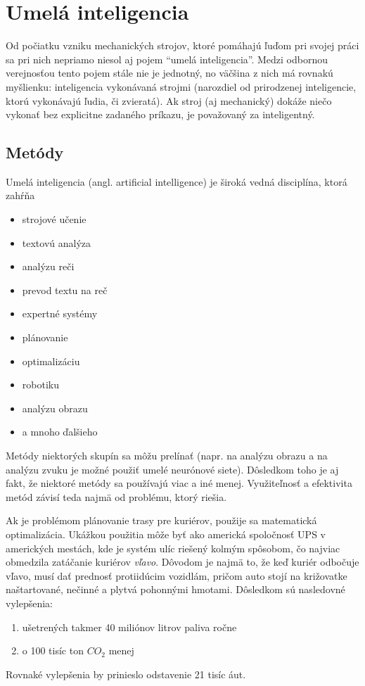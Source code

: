 \section{Umelá inteligencia}\label{sec:ai}

Od počiatku vzniku mechanických strojov, ktoré pomáhajú ľuďom pri svojej práci sa pri nich nepriamo niesol aj pojem
\enquote{umelá inteligencia}.
Medzi odbornou verejnosťou tento pojem stále nie je jednotný, no väčšina z nich má rovnakú myšlienku:
inteligencia vykonávaná strojmi (narozdiel od prirodzenej inteligencie, ktorú vykonávajú ľudia, či
zvieratá).\cite{ai_definition}
Ak stroj (aj mechanický) dokáže niečo vykonať bez explicitne zadaného príkazu, je považovaný za inteligentný.

\subsection{Metódy}\label{subsec:ai-methods}

Umelá inteligencia (angl. artificial intelligence) je široká vedná disciplína, ktorá zahŕňa
\begin{itemize}
    \item strojové učenie
    \item textovú analýza
    \item analýzu reči
    \item prevod textu na reč
    \item expertné systémy
    \item plánovanie
    \item optimalizáciu
    \item robotiku
    \item analýzu obrazu
    \item a mnoho ďalšieho
\end{itemize}
Metódy niektorých skupín sa môžu prelínať (napr. na analýzu obrazu a na analýzu zvuku je možné použiť umelé neurónové
siete).\cite{ai_ann_sound,ai_ann_image}
Dôsledkom toho je aj fakt, že niektoré metódy sa používajú viac a iné menej.
Využiteľnosť a efektivita metód závisí teda najmä od problému, ktorý riešia.

Ak je problémom plánovanie trasy pre kuriérov, použije sa matematická optimalizácia.
Ukážkou použitia môže byť ako americká spoločnosť UPS v amerických mestách, kde je systém ulíc riešený kolmým spôsobom,
čo najviac obmedzila zatáčanie kuriérov \emph{vľavo}.\cite{ups_optimization}
Dôvodom je najmä to, že keď kuriér odbočuje vľavo, musí dať prednosť protiidúcim vozidlám, pričom auto stojí na
križovatke naštartované, nečinné a plytvá pohonnými hmotami.
Dôsledkom sú nasledovné vylepšenia:
\begin{enumerate}
    \item ušetrených takmer 40 miliónov litrov paliva ročne
    \item o 100 tisíc ton $CO_2$ menej
\end{enumerate}
Rovnaké vylepšenia by prinieslo odstavenie 21 tisíc áut.

